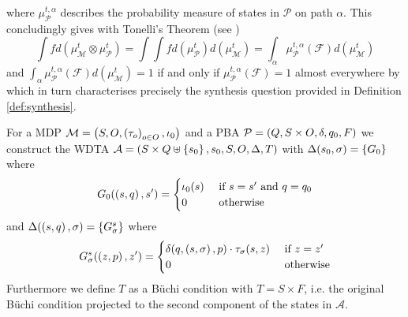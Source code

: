 where $\mu_{\mathcal{P}}^{t,\alpha}$ describes the probability measure of
states in $\mathcal{P}$ on path $\alpha$. This concludingly gives with
Tonelli's Theorem (see \cite[Theorem 23.6]{Bauer})
\begin{equation*}
  \int f d(\mu_{\mathcal{M}}^{t}\otimes\mu_{\mathcal{P}}^{t}) =
  \int\int f d(\mu_{\mathcal{P}}^{t})d(\mu_{\mathcal{M}}^{t}) =
  \int_{\alpha}\mu_{\mathcal{P}}^{t,\alpha}(\mathcal{F})d(\mu_{\mathcal{M}}^{t})
\end{equation*}
and $\int_{\alpha}\mu_{\mathcal{P}}^{t,\alpha}(\mathcal{F})
d(\mu_{\mathcal{M}}^{t}) = 1$ if and only if
$\mu_{\mathcal{P}}^{t,\alpha}(\mathcal{F}) = 1$ almost everywhere by
\cite[Lemma 40]{RandAutoInfTrees} which in turn characterises precisely the
synthesis question provided in Definition \ref{def:synthesis}.

\begin{definition}
  For a \ac{MDP} $\mathcal{M} = \left(S, O, \left(\tau_{o}\right)_{o\in O},
  \iota_{0}\right)$ and a \ac{PBA} $\mathcal{P} = \left(Q, S\times O, \delta, q_{0},
  F\right)$ we construct the \ac{WDTA}
  $\mathcal{A} = \left(S\times Q\uplus\left\{s_{0}\right\}, s_{0}, S, O, \Delta,
  T\right)$ with $\Delta(s_{0}, \sigma) = \left\{G_{0}\right\}$ where
  \begin{equation*}
    G_{0}(\left(s,q\right), s') =
    \begin{cases}
      \iota_{0}(s)&\text{ if }s = s'\text{ and }q = q_{0}\\
      0 &\text{ otherwise}
    \end{cases}
  \end{equation*}
  and $\Delta(\left(s, q\right), \sigma) = \left\{G^{s}_{\sigma}\right\}$ where
  \begin{equation*}
    G^{s}_{\sigma}(\left(z,p\right), z') =
    \begin{cases}
      \delta(q, \left(s,\sigma\right), p)\cdot\tau_{\sigma}(s,z)&\text{ if }z = z'\\
      0 &\text{ otherwise}
    \end{cases}
  \end{equation*}
  Furthermore we define $T$ as a Büchi condition with $T = S\times F$, i.e. the
  original Büchi condition projected to the second component of the
  states in $\mathcal{A}$.
\end{definition}
